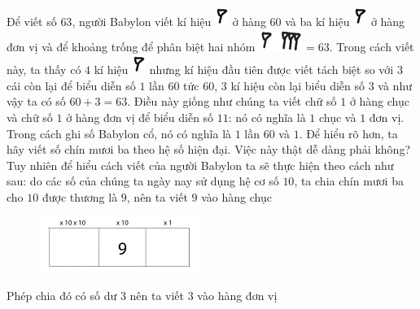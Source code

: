 \begin{multicols}{2}
\begin{figure}[H]
		\vspace*{-15pt}
	\end{figure}
	Để viết số $63$, người Babylon viết kí hiệu  \includegraphics[scale=0.7]{15}  ở hàng $60$ và ba kí hiệu \includegraphics[scale=0.7]{15}  ở hàng đơn vị và để khoảng trống để phân biệt hai nhóm
	\vskip 0.1cm
	\includegraphics[scale=0.7]{16.1}$=63$. Trong cách viết này, ta thấy có $4$ kí hiệu \includegraphics[scale=0.7]{15}   nhưng kí hiệu đầu tiên được viết tách biệt so với $3$ cái còn lại để biểu diễn số $1$ lần $60$ tức $60$, $3$ kí hiệu còn lại biểu diễn số $3$ và như vậy ta có số $60+3 =63$.
	\vskip 0.1cm
	Điều này giống như chúng ta viết chữ số $1$ ở hàng chục và chữ số $1$ ở hàng đơn vị để biểu diễn số $11$: nó có nghĩa là $1$ chục và $1$ đơn vị. Trong  cách ghi số  Babylon cổ, nó có nghĩa là $1$ lần $60$  và $1$.
	\vskip 0.1cm
	Để hiểu rõ hơn, ta hãy viết số chín mươi ba theo hệ số hiện đại. Việc này thật dễ dàng phải không? Tuy nhiên để hiểu cách viết của người Babylon ta sẽ thực hiện theo cách như sau: do các số của chúng ta ngày nay sử dụng hệ cơ số $10$, ta chia chín mươi ba cho $10$ được thương là $9$, nên ta viết $9$ vào hàng chục
	\begin{figure}[H]
		\centering
		\vspace*{-5pt}
		\captionsetup{labelformat= empty, justification=centering}
		\includegraphics[width=0.65\linewidth]{19}
		\vspace*{-10pt}
	\end{figure}
	Phép chia đó có số dư $3$ nên ta viết $3$ vào hàng đơn vị
	\begin{figure}[H]
		\centering
		\vspace*{-5pt}
		\captionsetup{labelformat= empty, justification=centering}

\end{figure}
\end{multicols}
